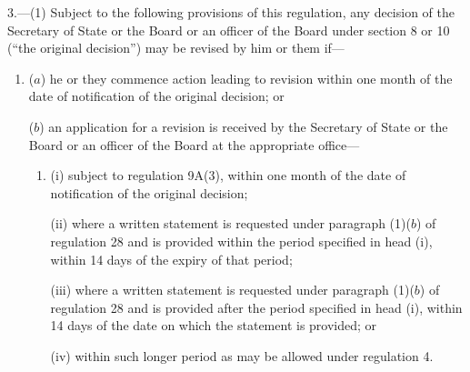 \documentclass[12pt,a4paper]{article}
\begin{document}
3.—(1) Subject to the following provisions of this regulation, any decision of the Secretary of State 
or the Board or an officer of the Board  %
under section 8 or 10 (“the original decision”) may be revised by him 
or them  %
if—
\begin{enumerate}\item[]

%
%
%
%

($a$) he or they commence action leading to revision within one month of the date of notification of the original decision; or

($b$) an application for a revision is received by the Secretary of State or the Board or an officer of the Board at the appropriate office—
\begin{enumerate}\item[]
(i) subject to regulation 9A(3), within one month of the date of notification of the original decision;

(ii) where a written statement is requested under paragraph (1)($b$)  of regulation 28 and is provided within the period specified in head (i), within 14 days of the expiry of that period;

(iii) where a written statement is requested under paragraph (1)($b$)  of regulation 28 and is provided after the period specified in head (i), within 14 days of the date on which the statement is provided; or

(iv) within such longer period as may be allowed under regulation 4.
\end{enumerate}
\end{enumerate}
\end{document}
